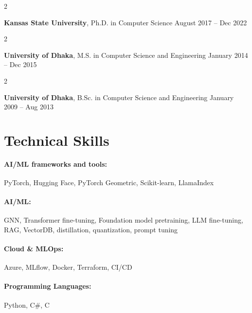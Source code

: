 \documentclass[10pt, letterpaper]{article}
\newenvironment{twocolentry}[2][]{
    \onecolentry
    \def\secondColumn{#2}
    \setcolumnwidth{\fill, 4.5 cm}
    \begin{paracol}{2}
}{
    \switchcolumn \raggedleft \secondColumn
    \end{paracol}
    \endonecolentry
} %
\begin{document}
        \begin{twocolentry}{
            August 2017 -- Dec 2022
        }
            \textbf{Kansas State University}, Ph.D. in Computer Science\end{twocolentry}

        \begin{twocolentry}{
            January 2014 -- Dec 2015
        }
            \textbf{University of Dhaka}, M.S. in Computer Science and Engineering\end{twocolentry}

        \begin{twocolentry}{
            January 2009 -- Aug 2013
        }
            \textbf{University of Dhaka}, B.Sc. in Computer Science and Engineering\end{twocolentry}

\vspace{-1mm}
\section{Technical Skills}

        \paragraph{AI/ML frameworks and tools:} PyTorch, Hugging Face, PyTorch Geometric, Scikit-learn, LlamaIndex
        \vspace{-4mm}
        \paragraph{AI/ML:} GNN, Transformer fine-tuning, Foundation model pretraining, LLM fine-tuning, RAG, VectorDB, distillation, quantization, prompt tuning
        \vspace{-4mm}
        \paragraph{Cloud \& MLOps:} Azure, MLflow, Docker, Terraform, CI/CD
        \vspace{-4mm}
        \paragraph{Programming Languages:} Python, C\#, C
\end{document}
